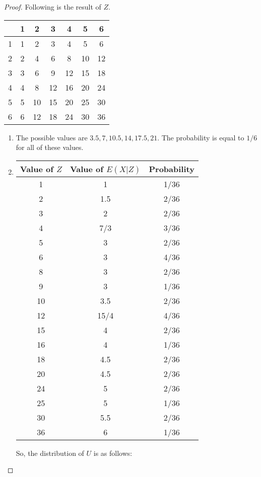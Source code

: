 \documentclass[a4paper]{article}\usepackage{amsmath,amssymb,amsthm,tikz,hyperref,mathtools}
\begin{document}
\begin{proof}
  Following is the result of $Z$.

  \begin{tabular}{c|c c c c c c }
    & 1 & 2 & 3 & 4 & 5 & 6 \\
    \hline
    1 & 1 & 2 & 3 & 4 & 5 & 6 \\
    2 & 2 & 4 & 6 & 8 & 10 & 12 \\
    3 & 3 & 6 & 9 & 12 & 15 & 18 \\
    4 & 4 & 8 & 12 & 16 & 20 & 24 \\
    5 & 5 & 10 & 15 & 20 & 25 & 30 \\
    6 & 6 & 12 & 18 & 24 & 30 & 36
  \end{tabular}
  
  \begin{enumerate}
    \item The possible values are $3.5, 7, 10.5, 14, 17.5, 21$. The probability is equal to $1/6$ for all of these values.
    \item 
    \begin{tabular}{c | c | c}
      Value of $Z$ & Value of $E(X | Z)$ & Probability
      \\
      \hline
      1 & 1 & 1/36
      \\
      2 & 1.5 & 2/36
      \\
      3 & 2 & 2/36
      \\
      4 & 7/3 & 3/36
      \\
      5 & 3 & 2/36
      \\
      6 & 3 & 4/36 
      \\
      8 & 3 & 2/36 
      \\
      9 & 3 & 1/36 
      \\
      10 & 3.5 & 2/36
      \\
      12 & 15/4& 4/36 
      \\
      15 & 4 & 2/36
      \\
      16 & 4 & 1/36
      \\
      18 & 4.5 & 2/36 
      \\
      20 & 4.5 & 2/36 
      \\
      24 & 5 & 2/36 
      \\
      25 & 5 & 1/36
      \\
      30 & 5.5 & 2/36
      \\
      36 & 6 & 1/36
    \end{tabular}
    So, the distribution of $U$ is as follows:


\end{enumerate}
\end{proof}
\end{document}
